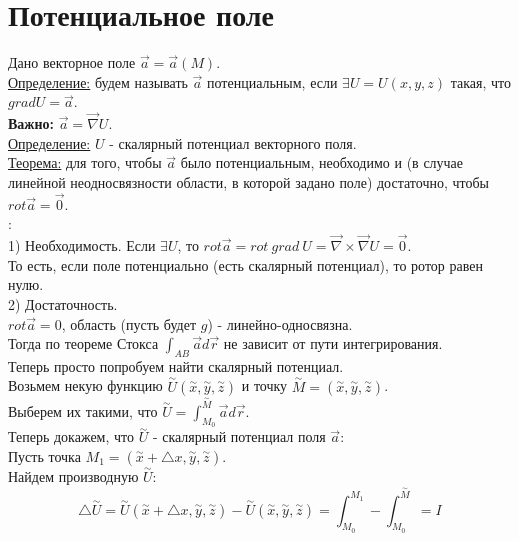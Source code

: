 \documentclass[12pt]{article}
\begin{document}
\section{Потенциальное поле}
Дано векторное поле $\overrightarrow{a} = \overrightarrow{a} (M)$.\\
\uline{Определение:} будем называть $\overrightarrow{a}$ потенциальным, если $\exists U = U(x,y,z)$ такая, что $grad U = \overrightarrow{a}$.\\
\textbf{Важно:} $\overrightarrow{a} = \overrightarrow{\nabla} U$.\\
\uline{Определение:} $U$ - скалярный потенциал векторного поля.\\
\uline{Теорема:} для того, чтобы $\overrightarrow{a}$ было потенциальным, необходимо и (в случае линейной неодносвязности области, в которой задано поле) достаточно, чтобы $rot \overrightarrow{a} = \overrightarrow{0}$.\\
:\\
1) Необходимость. Если $\exists U$, то $rot \overrightarrow{a} = rot \ grad \ U = \overrightarrow{\nabla} \times \overrightarrow{\nabla} U = \overrightarrow{0}$.\\
То есть, если поле потенциально (есть скалярный потенциал), то ротор равен нулю.\\
2) Достаточность.\\
$rot \overrightarrow{a} = 0$, область (пусть будет $g$) - линейно-односвязна.\\
Тогда по теореме Стокса $\int_{AB} \overrightarrow{a} d \overrightarrow{r}$ не зависит от пути интегрирования.\\
Теперь просто попробуем найти скалярный потенциал.\\
Возьмем некую функцию $\overset{\sim}{U}(\overset{\sim}{x},\overset{\sim}{y},\overset{\sim}{z})$ и точку $\overset{\sim}{M}=(\overset{\sim}{x},\overset{\sim}{y},\overset{\sim}{z})$.\\
Выберем их такими, что $\overset{\sim}{U} = \int_{M_0}^{\overset{\sim}{M}} \overrightarrow{a} d \overrightarrow{r}$.\\
Теперь докажем, что $\overset{\sim}{U}$ - скалярный потенциал поля $\overrightarrow{a}$:\\
Пусть точка $M_1 = (\overset{\sim}{x}+{\bigtriangleup x}, \overset{\sim}{y}, \overset{\sim}{z})$.\\
Найдем производную $\overset{\sim}{U}$:\\
$${\bigtriangleup \overset{\sim}{U}} = \overset{\sim}{U} (\overset{\sim}{x}+{\bigtriangleup x}, \overset{\sim}{y}, \overset{\sim}{z})-\overset{\sim}{U}(\overset{\sim}{x},\overset{\sim}{y},\overset{\sim}{z}) = \int_{M_0}^{M_1} - \int_{M_0}^{\overset{\sim}{M}} = I$$
\end{document}
